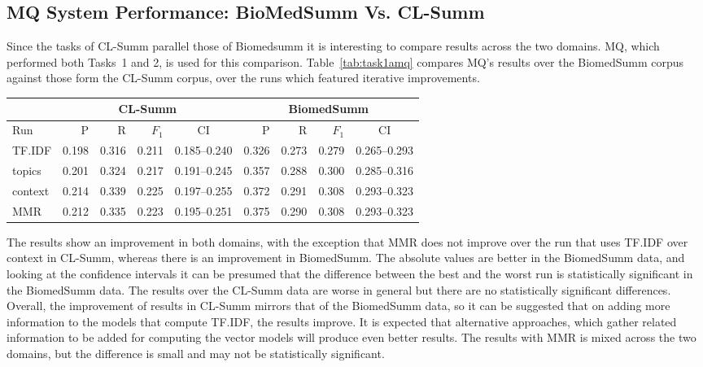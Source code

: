 \documentclass[11pt]{article}
\begin{document}
\subsection{MQ System Performance: BioMedSumm Vs. CL-Summ}

Since the tasks of CL-Summ parallel those of Biomedsumm it is
interesting to compare results across the two domains. MQ, which
performed both Tasks~1 and 2, is used for this comparison.
Table~\ref{tab:task1amq} compares MQ's results over the BiomedSumm
corpus against those form the CL-Summ corpus, over the runs which
featured iterative improvements.

\begin{table*}
  \centering
  \begin{tabular}{|l|r|r|r|c|r|r|r|c|}
  	\hline
	& \multicolumn{4}{|c|}{CL-Summ} & \multicolumn{4}{|c|}{BiomedSumm}\\
	\hline
	Run & P & R & $F_1$ & CI & P & R & $F_1$ & CI\\
	\hline
    TF.IDF & 0.198 & 0.316 & 0.211 & 0.185--0.240 & 0.326 & 0.273 & 0.279 & 0.265--0.293\\
	topics & 0.201 & 0.324 & 0.217 & 0.191--0.245 & 0.357 & 0.288 & 0.300
	& 0.285--0.316\\
	context & 0.214 & 0.339 & 0.225 & 0.197--0.255 & 0.372 & 0.291 & 0.308
	& 0.293--0.323\\
	MMR & 0.212 & 0.335 & 0.223 & 0.195--0.251 &  0.375 & 0.290 & 0.308 & 0.293--0.323\\ 
	\hline
  \end{tabular}
  \caption{ROUGE-L results of the MQ system runs for Task 1A.}
  \label{tab:task1amq}
\end{table*}

The results show an improvement in both domains, with the exception
that MMR does not improve over the run that uses TF.IDF over context
in CL-Summ, whereas there is an improvement in BiomedSumm. The
absolute values are better in the BiomedSumm data, and looking at the
confidence intervals it can be presumed that the difference between
the best and the worst run is statistically significant in the
BiomedSumm data.  The results over the CL-Summ data are worse in
general but there are no statistically significant differences.
Overall, the improvement of results in CL-Summ mirrors that of the
BiomedSumm data, so it can be suggested that on adding more
information to the models that compute TF.IDF, the results improve. It
is expected that alternative approaches, which gather related
information to be added for computing the vector models will produce
even better results. The results with MMR is mixed across the two
domains, but the difference is small and may not be statistically
significant.
\end{document}
